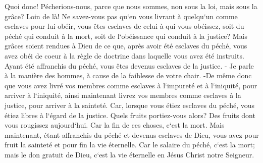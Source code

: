 \verse Quoi donc! Pécherions-nous, parce que nous sommes, non sous la loi, mais sous la grâce? Loin de là! 
\verse Ne savez-vous pas qu`en vous livrant à quelqu`un comme esclaves pour lui obéir, vous êtes esclaves de celui à qui vous obéissez, soit du péché qui conduit à la mort, soit de l`obéissance qui conduit à la justice? 
\verse Mais grâces soient rendues à Dieu de ce que, après avoir été esclaves du péché, vous avez obéi de coeur à la règle de doctrine dans laquelle vous avez été instruits. 
\verse Ayant été affranchis du péché, vous êtes devenus esclaves de la justice. - 
\verse Je parle à la manière des hommes, à cause de la faiblesse de votre chair. -De même donc que vous avez livré vos membres comme esclaves à l`impureté et à l`iniquité, pour arriver à l`iniquité, ainsi maintenant livrez vos membres comme esclaves à la justice, pour arriver à la sainteté. 
\verse Car, lorsque vous étiez esclaves du péché, vous étiez libres à l`égard de la justice. 
\verse Quels fruits portiez-vous alors? Des fruits dont vous rougissez aujourd`hui. Car la fin de ces choses, c`est la mort. 
\verse Mais maintenant, étant affranchis du péché et devenus esclaves de Dieu, vous avez pour fruit la sainteté et pour fin la vie éternelle. 
\verse Car le salaire du péché, c`est la mort; mais le don gratuit de Dieu, c`est la vie éternelle en Jésus Christ notre Seigneur. 

